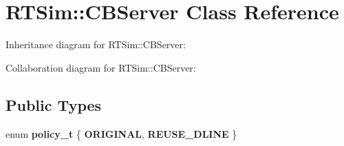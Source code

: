 \hypertarget{classRTSim_1_1CBServer}{}\section{R\+T\+Sim\+:\+:C\+B\+Server Class Reference}
\label{classRTSim_1_1CBServer}


Inheritance diagram for R\+T\+Sim\+:\+:C\+B\+Server\+:


Collaboration diagram for R\+T\+Sim\+:\+:C\+B\+Server\+:
\subsection*{Public Types}
\begin{DoxyCompactItemize}
\item 
enum {\bfseries policy\+\_\+t} \{ {\bfseries O\+R\+I\+G\+I\+N\+AL}, 
{\bfseries R\+E\+U\+S\+E\+\_\+\+D\+L\+I\+NE}
 \}\hypertarget{classRTSim_1_1CBServer_a83e49c2a7a5031a437cb392822a38f58}{}\label{classRTSim_1_1CBServer_a83e49c2a7a5031a437cb392822a38f58}

\end{DoxyCompactItemize}
